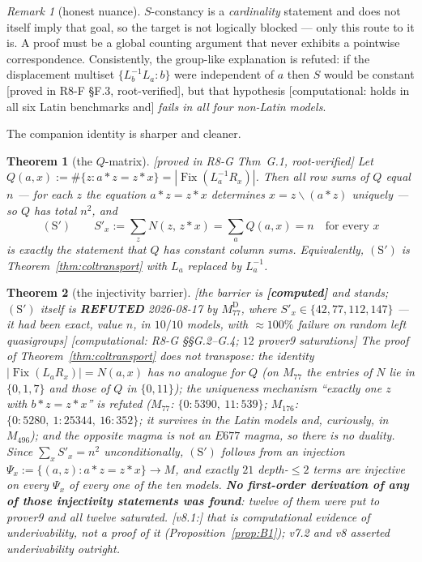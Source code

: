 \documentclass[11pt]{article}
\theoremstyle{plain}
\newtheorem{theorem}{Theorem}[section]
\theoremstyle{definition}
\theoremstyle{remark}
\newtheorem*{remark*}{Remark}
\numberwithin{equation}{section}
\newcommand{\op}{\mathbin{*}}
\newcommand{\Fix}{\operatorname{Fix}}
\newcommand{\statusbox}[1]{{\small\sloppy\textsf{[#1]}}}
\newcommand{\MV}[1]{\statusbox{machine-verified: \texttt{#1}}}
\newcommand{\PROVED}[1]{\statusbox{proved in #1, root-verified}}
\newcommand{\COMP}[1]{\statusbox{computational: #1}}
\begin{document}
\begin{remark*}[honest nuance]
$S$-constancy is a \emph{cardinality} statement and does not itself imply that
goal, so the target is not logically blocked --- only this route to it is. A proof
must be a global counting argument that never exhibits a pointwise
correspondence. Consistently, the group-like explanation is refuted: if the
displacement multiset $\{L_b^{-1}L_a : b\}$ were independent of $a$ then $S$ would
be constant \PROVED{R8-F \S F.3}, but that hypothesis \COMP{holds in all six Latin
benchmarks and} \emph{fails in all four non-Latin models}.
\end{remark*}

The companion identity is sharper and cleaner.

\begin{theorem}[the $Q$-matrix]\label{thm:Qmatrix}
\PROVED{R8-G Thm~G.1}\;\MV{problems\slash etp677\slash R8\_invariants.py}
Let $Q(a,x) := \#\{z : a\op z = z\op x\} = |\Fix(L_a^{-1}R_x)|$. Then all row sums
of $Q$ equal $n$ --- for each $z$ the equation $a\op z = z\op x$ determines
$x = z\backslash(a\op z)$ uniquely --- so $Q$ has total $n^2$, and
\[
  (\mathrm{S}')\qquad S'_x := \sum_zN(z,\,z\op x) = \sum_aQ(a,x) = n
  \quad\text{for every } x
\]
is exactly the statement that $Q$ has constant column sums. Equivalently,
$(\mathrm{S}')$ is Theorem~\ref{thm:coltransport} with $L_a$ replaced by
$L_a^{-1}$.
\end{theorem}

\begin{theorem}[the injectivity barrier]\label{thm:barrier2}
\statusbox{the barrier is \textbf{[computed]} and stands; $(\mathrm{S}')$ itself is
\textbf{REFUTED} 2026-08-17 by $M_{77}^{\mathrm{D}}$, where
$S'_x\in\{42,77,112,147\}$ --- it had been exact, value $n$, in $10/10$ models,
with $\approx100\%$ failure on random left quasigroups}
\COMP{R8-G \S\S G.2--G.4; $12$ prover9 saturations}
The proof of Theorem~\ref{thm:coltransport} does not transpose: the identity
$|\Fix(L_aR_x)| = N(a,x)$ has no analogue for $Q$ (on $M_{77}$ the entries of $N$
lie in $\{0,1,7\}$ and those of $Q$ in $\{0,11\}$); the uniqueness mechanism
``exactly one $z$ with $b\op z = z\op x$'' is \emph{refuted}
($M_{77}$: $\{0\!:\!5390,\ 11\!:\!539\}$; $M_{176}$:
$\{0\!:\!5280,\ 1\!:\!25344,\ 16\!:\!352\}$; it survives in the Latin models and,
curiously, in $M_{496}$); and the opposite magma is not an $E677$ magma, so there
is no duality. Since $\sum_xS'_x = n^2$ unconditionally, $(\mathrm{S}')$ follows
from an \emph{injection} $\Psi_x := \{(a,z) : a\op z = z\op x\}\to M$, and exactly
$21$ depth-$\le2$ terms are injective on every $\Psi_x$ of every one of the ten
models. \textbf{No first-order derivation of any of those injectivity statements
was found}: twelve of them were put to prover9 and all twelve saturated. [v8.1:]
that is computational evidence of underivability, not a proof of it
(Proposition~\ref{prop:B1}); v7.2 and v8 asserted underivability outright.
\end{theorem}
\end{document}
